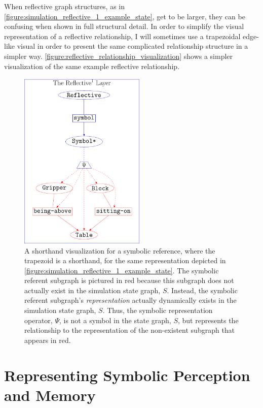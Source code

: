 When reflective graph structures, as in
{\mbox{\autoref{figure:simulation_reflective_1_example_state}}}, get
to be larger, they can be confusing when shown in full structural
detail.  In order to simplify the visual representation of a
reflective relationship, I will sometimes use a trapezoidal edge-like
visual in order to present the same complicated relationship structure
in a simpler way.
{\mbox{\autoref{figure:reflective_relationship_visualization}}} shows
a simpler visualization of the same example reflective relationship.
\begin{figure}
\center
\includegraphics[width=6cm]{gfx/reflective_relationship_visualization}
\caption[A shorthand visualization for a symbolic reference.]{A
  shorthand visualization for a symbolic reference, where the
  trapezoid is a shorthand, for the same representation depicted in
  {\mbox{\autoref{figure:simulation_reflective_1_example_state}}}.
  The symbolic referent subgraph is pictured in red because this
  subgraph does not actually exist in the simulation state graph, $S$.
  Instead, the symbolic referent subgraph's \emph{representation}
  actually dynamically exists in the simulation state graph,
  $S$. Thus, the symbolic representation operator, $\Psi$, is not a
  symbol in the state graph, $S$, but represents the relationship to
  the representation of the non-existent subgraph that appears in
  red.}
\label{figure:reflective_relationship_visualization}
\end{figure}

\section{Representing Symbolic Perception and Memory}

